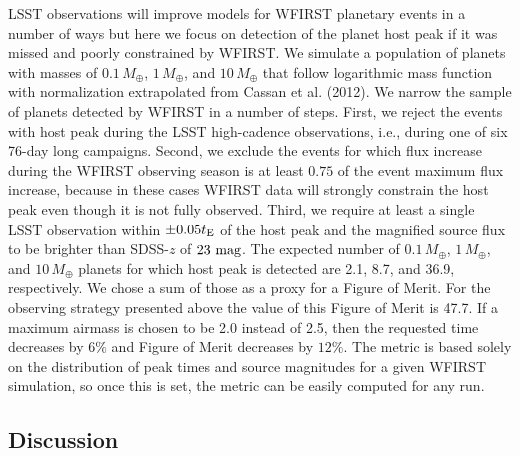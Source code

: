 LSST observations will improve models for WFIRST planetary events
in a number of ways but here we focus on detection of the planet
host peak if it was missed and poorly constrained by WFIRST. We simulate
a population of planets with masses of $0.1\,M_\oplus$, $1\,M_\oplus$,
and $10\,M_\oplus$ that follow logarithmic mass function with
normalization extrapolated from Cassan et al. (2012). We narrow the sample of
planets detected by WFIRST in a number of steps. First, we reject the events
with host peak during the LSST high-cadence observations, i.e., during one of six
76-day long campaigns. Second, we exclude the events for which flux increase 
during the WFIRST observing season is at least $0.75$ of the event maximum 
flux increase, because in these cases WFIRST
data will strongly constrain the host peak even though it is not fully observed.
Third, we require at least a single LSST observation within $\pm0.05t_{\rm E}$ of
the host peak and the magnified source flux to be brighter than SDSS-$z$ of $23~{\rm mag}$.
The expected number of $0.1\,M_\oplus$, $1\,M_\oplus$, and $10\,M_\oplus$
planets for which host peak is detected are 2.1, 8.7, and 36.9, respectively.
We chose a sum of those as a proxy for a Figure of Merit. For the observing strategy
presented above the value of this Figure of Merit is 47.7. If a maximum airmass is chosen to be
2.0 instead of 2.5, then the requested time decreases by $6\%$ and Figure of Merit decreases by $12\%$.
The metric is based solely on the distribution of peak times and source magnitudes
for a given WFIRST simulation, so once this is set, the metric can
be easily computed for any \OpSim run.



%
%
%
%

\subsection{Discussion}
\label{sec:\secname:discussion}

